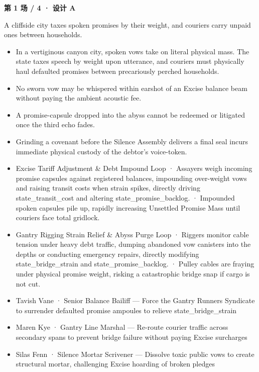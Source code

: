\documentclass[10pt,a4paper]{article}
\newcommand{\heading}[1]{\par\vspace{5pt}{\color{teal}\bfseries #1}\par}
\begin{document}
\clearpage
{\Large\bfseries 第 1 场 / 4 · 设计 A}\par
\heading{共同生成要求}
{\small A cliffside city taxes spoken promises by their weight, and couriers carry unpaid ones between households.}\par\vspace{6pt}
\begin{minipage}[t]{0.48\linewidth}\fontsize{9}{12}\selectfont\raggedright\setlength{\parskip}{0pt}
\heading{世界概述}\begin{itemize}
\item In a vertiginous canyon city, spoken vows take on literal physical mass. The state taxes speech by weight upon utterance, and couriers must physically haul defaulted promises between precariously perched households.
\end{itemize}
\heading{规则与制度}\begin{itemize}
\item No sworn vow may be whispered within earshot of an Excise balance beam without paying the ambient acoustic fee.
\item A promise-capsule dropped into the abyss cannot be redeemed or litigated once the third echo fades.
\item Grinding a covenant before the Silence Assembly delivers a final seal incurs immediate physical custody of the debtor's voice-token.
\end{itemize}
\heading{活动与压力}\begin{itemize}
\item Excise Tariff Adjustment \& Debt Impound Loop · Assayers weigh incoming promise capsules against registered balances, impounding over-weight vows and raising transit costs when strain spikes, directly driving state\_transit\_cost and altering state\_promise\_backlog. · Impounded spoken capsules pile up, rapidly increasing Unsettled Promise Mass until couriers face total gridlock.
\item Gantry Rigging Strain Relief \& Abyss Purge Loop · Riggers monitor cable tension under heavy debt traffic, dumping abandoned vow canisters into the depths or conducting emergency repairs, directly modifying state\_bridge\_strain and state\_promise\_backlog. · Pulley cables are fraying under physical promise weight, risking a catastrophic bridge snap if cargo is not cut.
\end{itemize}
\heading{人物与目标}\begin{itemize}
\item Tavish Vane · Senior Balance Bailiff — Force the Gantry Runners Syndicate to surrender defaulted promise ampoules to relieve state\_bridge\_strain
\item Maren Kye · Gantry Line Marshal — Re-route courier traffic across secondary spans to prevent bridge failure without paying Excise surcharges
\item Silas Fenn · Silence Mortar Scrivener — Dissolve toxic public vows to create structural mortar, challenging Excise hoarding of broken pledges
\end{itemize}
\end{minipage}\hfill
\end{document}
